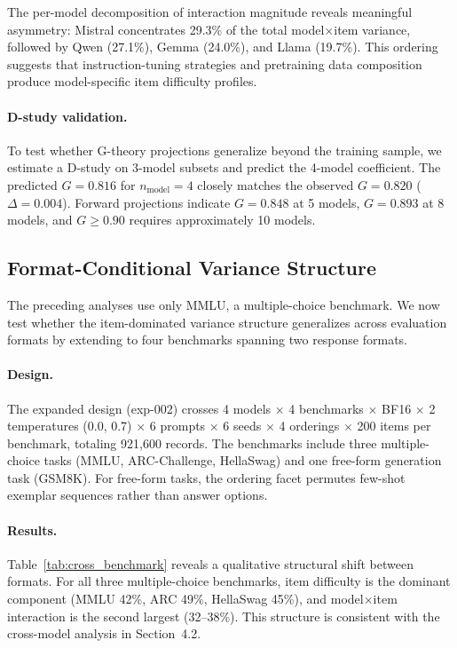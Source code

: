 The per-model decomposition of interaction magnitude reveals meaningful asymmetry: Mistral concentrates 29.3\% of the total model$\times$item variance, followed by Qwen (27.1\%), Gemma (24.0\%), and Llama (19.7\%). This ordering suggests that instruction-tuning strategies and pretraining data composition produce model-specific item difficulty profiles.

\paragraph{D-study validation.} To test whether G-theory projections generalize beyond the training sample, we estimate a D-study on 3-model subsets and predict the 4-model coefficient. The predicted $G = 0.816$ for $n_\text{model} = 4$ closely matches the observed $G = 0.820$ ($\Delta = 0.004$). Forward projections indicate $G = 0.848$ at 5 models, $G = 0.893$ at 8 models, and $G \geq 0.90$ requires approximately 10 models.

\subsection{Format-Conditional Variance Structure}
\label{sec:format_conditional}

The preceding analyses use only MMLU, a multiple-choice benchmark. We now test whether the item-dominated variance structure generalizes across evaluation formats by extending to four benchmarks spanning two response formats.

\paragraph{Design.} The expanded design (exp-002) crosses 4 models $\times$ 4 benchmarks $\times$ BF16 $\times$ 2 temperatures (0.0, 0.7) $\times$ 6 prompts $\times$ 6 seeds $\times$ 4 orderings $\times$ 200 items per benchmark, totaling 921,600 records. The benchmarks include three multiple-choice tasks (MMLU, ARC-Challenge, HellaSwag) and one free-form generation task (GSM8K). For free-form tasks, the ordering facet permutes few-shot exemplar sequences rather than answer options.


\paragraph{Results.} Table~\ref{tab:cross_benchmark} reveals a qualitative structural shift between formats. For all three multiple-choice benchmarks, item difficulty is the dominant component (MMLU 42\%, ARC 49\%, HellaSwag 45\%), and model$\times$item interaction is the second largest (32--38\%). This structure is consistent with the cross-model analysis in Section~4.2.


